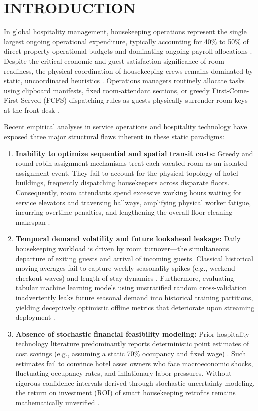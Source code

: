 \documentclass[11pt,a4paper]{article}
\begin{document}
\section{INTRODUCTION}

In global hospitality management, housekeeping operations represent the single largest ongoing operational expenditure, typically accounting for 40\% to 50\% of direct property operational budgets and dominating ongoing payroll allocations \cite{weatherford2003,guerrier1989,krause2005}. Despite the critical economic and guest-satisfaction significance of room readiness, the physical coordination of housekeeping crews remains dominated by static, uncoordinated heuristics \cite{chan2013,hancer2003}. Operations managers routinely allocate tasks using clipboard manifests, fixed room-attendant sections, or greedy First-Come-First-Served (FCFS) dispatching rules as guests physically surrender room keys at the front desk \cite{pullman2002,kimes2004}.

Recent empirical analyses in service operations and hospitality technology have exposed three major structural flaws inherent in these static paradigms:
\begin{enumerate}
    \item \textbf{Inability to optimize sequential and spatial transit costs:} Greedy and round-robin assignment mechanisms treat each vacated room as an isolated assignment event. They fail to account for the physical topology of hotel buildings, frequently dispatching housekeepers across disparate floors. Consequently, room attendants spend excessive working hours waiting for service elevators and traversing hallways, amplifying physical worker fatigue, incurring overtime penalties, and lengthening the overall floor cleaning makespan \cite{krause2005,ernst2004}.
    \item \textbf{Temporal demand volatility and future lookahead leakage:} Daily housekeeping workload is driven by room turnover---the simultaneous departure of exiting guests and arrival of incoming guests. Classical historical moving averages fail to capture weekly seasonality spikes (e.g., weekend checkout waves) and length-of-stay dynamics \cite{song2019,ampountolas2021}. Furthermore, evaluating tabular machine learning models using unstratified random cross-validation inadvertently leaks future seasonal demand into historical training partitions, yielding deceptively optimistic offline metrics that deteriorate upon streaming deployment \cite{antonio2019,ampountolas2026}.
    \item \textbf{Absence of stochastic financial feasibility modeling:} Prior hospitality technology literature predominantly reports deterministic point estimates of cost savings (e.g., assuming a static 70\% occupancy and fixed wage) \cite{ivanov2019,sainaghi2019}. Such estimates fail to convince hotel asset owners who face macroeconomic shocks, fluctuating occupancy rates, and inflationary labor pressures. Without rigorous confidence intervals derived through stochastic uncertainty modeling, the return on investment (ROI) of smart housekeeping retrofits remains mathematically unverified \cite{metropolis1949,bls2024}.
\end{enumerate}
\end{document}
